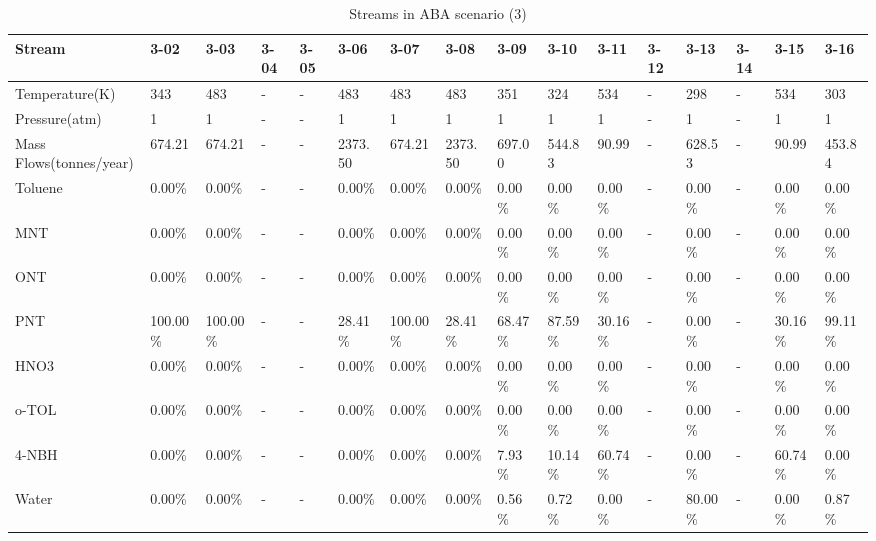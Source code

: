 \begin{landscape}
\begin{table}[H]
\centering
\caption{Streams in ABA scenario (3)}
\label{ABAFST3}
\begin{tabular}{|l|l|l|l|l|l|l|l|l|l|l|l|l|l|l|l|}
\hline
\textbf{Stream}         & 3-02     & 3-03     & 3-04 & 3-05 & 3-06    & 3-07     & 3-08    & 3-09    & 3-10    & 3-11    & 3-12 & 3-13    & 3-14 & 3-15    & 3-16    \\ \hline
Temperature(K)          & 343      & 483      & -    & -    & 483     & 483      & 483     & 351     & 324     & 534     & -    & 298     & -    & 534     & 303     \\ \hline
Pressure(atm)           & 1        & 1        & -    & -    & 1       & 1        & 1       & 1       & 1       & 1       & -    & 1       & -    & 1       & 1       \\ \hline
Mass Flows(tonnes/year) & 674.21   & 674.21   & -    & -    & 2373.50 & 674.21   & 2373.50 & 697.00  & 544.83  & 90.99   & -    & 628.53  & -    & 90.99   & 453.84  \\ \hline
Toluene                 & 0.00\%   & 0.00\%   & -    & -    & 0.00\%  & 0.00\%   & 0.00\%  & 0.00\%  & 0.00\%  & 0.00\%  & -    & 0.00\%  & -    & 0.00\%  & 0.00\%  \\ \hline
MNT                     & 0.00\%   & 0.00\%   & -    & -    & 0.00\%  & 0.00\%   & 0.00\%  & 0.00\%  & 0.00\%  & 0.00\%  & -    & 0.00\%  & -    & 0.00\%  & 0.00\%  \\ \hline
ONT                     & 0.00\%   & 0.00\%   & -    & -    & 0.00\%  & 0.00\%   & 0.00\%  & 0.00\%  & 0.00\%  & 0.00\%  & -    & 0.00\%  & -    & 0.00\%  & 0.00\%  \\ \hline
PNT                     & 100.00\% & 100.00\% & -    & -    & 28.41\% & 100.00\% & 28.41\% & 68.47\% & 87.59\% & 30.16\% & -    & 0.00\%  & -    & 30.16\% & 99.11\% \\ \hline
HNO3                    & 0.00\%   & 0.00\%   & -    & -    & 0.00\%  & 0.00\%   & 0.00\%  & 0.00\%  & 0.00\%  & 0.00\%  & -    & 0.00\%  & -    & 0.00\%  & 0.00\%  \\ \hline
o-TOL                   & 0.00\%   & 0.00\%   & -    & -    & 0.00\%  & 0.00\%   & 0.00\%  & 0.00\%  & 0.00\%  & 0.00\%  & -    & 0.00\%  & -    & 0.00\%  & 0.00\%  \\ \hline
4-NBH                   & 0.00\%   & 0.00\%   & -    & -    & 0.00\%  & 0.00\%   & 0.00\%  & 7.93\%  & 10.14\% & 60.74\% & -    & 0.00\%  & -    & 60.74\% & 0.00\%  \\ \hline
Water                   & 0.00\%   & 0.00\%   & -    & -    & 0.00\%  & 0.00\%   & 0.00\%  & 0.56\%  & 0.72\%  & 0.00\%  & -    & 80.00\% & -    & 0.00\%  & 0.87\%  \\ \hline

\end{tabular}
\end{table}
\end{landscape}
